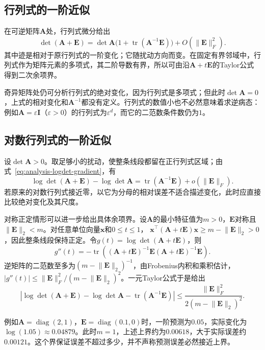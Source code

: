 \subsection{行列式的一阶近似}

在可逆矩阵$\bm A$处，行列式微分给出
\[
 \det(\bm A+\bm E)=\det\bm A\bigl(1+\operatorname{tr}(\bm A^{-1}\bm E)\bigr)+O(\lVert\bm E\rVert_F^2).
\]
其中迹是相对于原行列式的一阶变化；它随扰动方向而变。在固定有界邻域中，行列式作为矩阵元素的多项式，其二阶导数有界，所以可由沿$\bm A+t\bm E$的Taylor公式得到二次余项界。

奇异矩阵处仍可分析行列式的绝对变化，因为行列式是多项式；但此时$\det\bm A=0$，上式的相对变化和$\bm A^{-1}$都没有定义。行列式的数值小也不必然意味着求逆病态：例如$\bm A=\varepsilon\bm I$（$\varepsilon>0$）的行列式为$\varepsilon^d$，而它的二范数条件数仍为$1$。

\subsection{对数行列式的一阶近似}

设$\det\bm A>0$。取足够小的扰动，使整条线段都留在正行列式区域；由式~\eqref{eq:analysis-logdet-gradient}，有
\[
 \log\det(\bm A+\bm E)-\log\det\bm A
 =\operatorname{tr}(\bm A^{-1}\bm E)+o(\lVert\bm E\rVert_F).
\]
若原来的对数行列式接近零，以它为分母的相对误差不适合描述变化，此时应直接比较绝对变化及其尺度。

对称正定情形可以进一步给出具体余项界。设$\bm A$的最小特征值为$m>0$，$\bm E$对称且$\lVert\bm E\rVert_2<m$。对任意单位向量$\bm x$和$0\leq t\leq1$，
$\bm x^\top(\bm A+t\bm E)\bm x\geq m-\lVert\bm E\rVert_2>0$，因此整条线段保持正定。令$g(t)=\log\det(\bm A+t\bm E)$，则
\[
 g''(t)=-\operatorname{tr}\!\left((\bm A+t\bm E)^{-1}\bm E
 (\bm A+t\bm E)^{-1}\bm E\right).
\]
逆矩阵的二范数至多为$(m-\lVert\bm E\rVert_2)^{-1}$，由Frobenius内积和乘积估计，
$|g''(t)|\leq\lVert\bm E\rVert_F^2/(m-\lVert\bm E\rVert_2)^2$。一元Taylor公式于是给出
\[
 \left|\log\det(\bm A+\bm E)-\log\det\bm A
 -\operatorname{tr}(\bm A^{-1}\bm E)\right|
 \leq\frac{\lVert\bm E\rVert_F^2}{2(m-\lVert\bm E\rVert_2)^2}.
\]

例如$\bm A=\operatorname{diag}(2,1)$，$\bm E=\operatorname{diag}(0.1,0)$时，一阶预测为$0.05$，实际变化为$\log(1.05)\approx0.04879$。此时$m=1$，上述上界约为$0.00618$，大于实际误差约$0.00121$。这个界保证误差不超过多少，并不声称预测误差必然接近上界。
